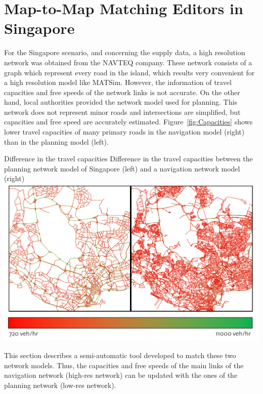 \section{Map-to-Map Matching Editors in Singapore}
\citet[][]{Ordonez_Webpage_2011_3}
For the Singapore scenario, and concerning the supply data, a high resolution network was obtained from the NAVTEQ company. These network consists of a graph which represent every road in the island, which results very convenient for a high resolution model like MATSim. However, the information of travel capacities and free speeds of the network links is not accurate. On the other hand, local authorities provided the network model used for planning. This network does not represent minor roads and intersections are simplified, but capacities and free speed are accurately estimated. Figure~\ref{fig:Capacities} shows lower travel capacities of many primary roads in the navigation model (right) than in the planning model (left).

\createfigure
{Difference in the travel capacities}
{Difference in the travel capacities between the planning network model of Singapore (left) and a navigation network model (right)}
{\label{fig:Capacities}}
{\includegraphics[width=1.0\textwidth]{extending/figures/netEdSing/Capacities.png}}
{}

This section describes a semi-automatic tool developed to match these two network models. Thus, the capacities and free speeds of the main links of the navigation network (high-res network) can be updated with the ones of the planning network (low-res network).

